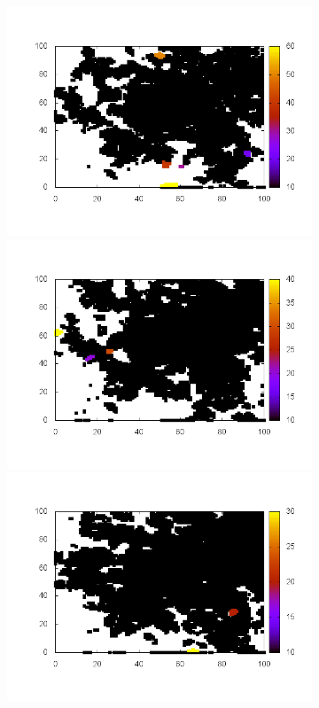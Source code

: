 \documentclass[10pt,a4paper]{article}
\begin{document}
\begin{figure}
\begin{subfigure}[b]{1\textwidth}
\end{subfigure}
\begin{subfigure}[b]{1\textwidth}
\includegraphics[scale=.3]{./img/stampe/scc1/18.png}
\includegraphics[scale=.3]{./img/stampe/scc1/19.png}
\includegraphics[scale=.3]{./img/stampe/scc1/20.png}

\end{subfigure}
\end{figure}
\end{document}
